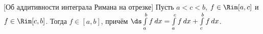 [Об аддитивности интеграла Римана на отрезке]\label{AddiRim}
 	Пусть $a<c<b$, $f\in\Rim[a,c]$ и $f\in\Rim[c,b]$. Тогда $f\in[a,b]$, причём $\ds\int\limits_a^bf\,dx=\int\limits_a^cf\,dx+\int\limits_c^bf\,dx$.
 